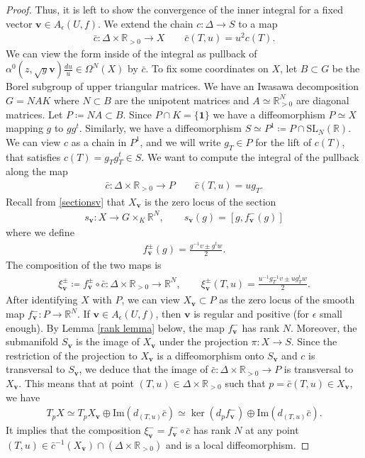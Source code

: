 \documentclass[twoside,a4paper,10pt]{article} %
\newcommand{\8}{\infty}
\newcommand{\id}{\mathbf{1}}
\newcommand{\vbf}{\mathbf{v}}
\newcommand{\SL}{\mathrm{SL}}
\newcommand{\R}{\mathbb{R}}
\newcommand{\im}{\mathrm{Im}}
\theoremstyle{mytheoremstyle}
\theoremstyle{remark}
\numberwithin{equation}{section}
\begin{document}
\begin{proof}
 Thus, it is left to show the convergence of the inner integral for a fixed vector $\vbf \in A_\epsilon(U,f)$. We extend the chain  $c \colon \Delta \longrightarrow S$ to a map
 \begin{align}
\bar{c} \colon \Delta \times \R_{>0} \longrightarrow X \qquad \bar{c}(T,u)=u^2c(T).
\end{align}We can view the form inside of the integral as pullback of $ \alpha^0(z,\sqrt{y}\vbf) \frac{du}{u} \in \Omega^{N}(X)$ by $\bar{c}$. To fix some coordinates on $X$, let $B \subset G$ be the Borel subgroup of upper triangular matrices. We have an Iwasawa decomposition $G=NAK$ where $N \subset B$ are the unipotent matrices and $A \simeq \R_{>0}^N$ are diagonal matrices. Let $P \coloneqq NA \subset B$. Since $P \cap K=\{\id\}$ we have a diffeomorphism $P \simeq X$ mapping $g$ to $gg^t$.  Similarly, we have a diffeomorphism $S \simeq P^1 \coloneqq P \cap \SL_N(\R)$. We can view $c$ as a chain in $P^1$, and we will write $g_T \in P$ for the lift of $c(T)$, that satisfies $c(T)=g_Tg_T^t \in S$. We want to compute the integral of the pullback along the map
\begin{align}
\bar{c} \colon \Delta \times \R_{>0} \longrightarrow P \qquad \bar{c}(T,u)=ug_T.
\end{align}
Recall from \eqref{sectionsv} that $X_\vbf$ is the zero locus of the section
\begin{align}
s_\vbf \colon X \longrightarrow G \times_K \R^N, \qquad s_\vbf(g)=\left [g,f_\vbf^-(g) \right ]
\end{align}
where we define
\begin{align}
f_\vbf^\pm (g) = \frac{g^{-1}v\pm g^t w}{2}.
\end{align}
The composition of the two maps is
\begin{align} \label{local diff}
\xi_\vbf^\pm \coloneqq f_\vbf^\pm \circ \bar{c} \colon \Delta \times \R_{>0} \longrightarrow \R^N, \qquad \xi_\vbf^\pm(T,u)=\frac{u^{-1}g_T^{-1}v \pm ug_T^{t}w}{2}.
\end{align}
After identifying $X$ with $P$, we can view $X_\vbf \subset P$ as the zero locus of the smooth map $f_\vbf^-  \colon P \longrightarrow \R^N$.
If $\vbf \in A_\epsilon(U,f)$, then $\vbf$ is regular and positive (for $\epsilon$ small enough).  By Lemma \ref{rank lemma} below, the map $f^-_\vbf$ has rank $N$. Moreover, the submanifold $S_\vbf$ is the image of $X_\vbf$ under the projection $\pi\colon X \rightarrow S$. Since the restriction of the projection to $X_\vbf$ is a diffeomorphism onto $S_\vbf$ and $c$ is transversal to $S_\vbf$, we deduce that the image of $\bar{c} \colon \Delta \times \R_{>0} \longrightarrow P$ is transversal to $X_\vbf$. This means that at point $(T,u) \in \Delta \times \R_{>0}$ such that $p=\bar{c}(T,u) \in X_\vbf$, we have
\begin{align}
T_pX \simeq T_pX_\vbf \oplus \im(d_{(T,u)}\bar{c}) \simeq \ker(d_pf_\vbf^-) \oplus \im(d_{(T,u)}\bar{c}).
\end{align}It implies that the composition $\xi_\vbf^- = f_\vbf^- \circ \bar{c}$ has rank $N$ at any point $(T,u) \in \bar{c}^{-1}(X_\vbf) \cap (\Delta \times \R_{>0})$ and is a local diffeomorphism.


\end{proof}
\end{document}
